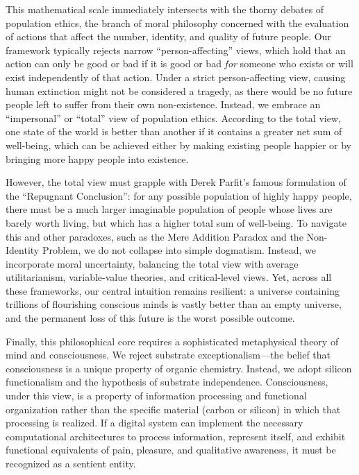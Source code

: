This mathematical scale immediately intersects with the thorny debates
of population ethics, the branch of moral philosophy concerned with the
evaluation of actions that affect the number, identity, and quality of
future people. Our framework typically rejects narrow
``person-affecting'' views, which hold that an action can only be good
or bad if it is good or bad \emph{for} someone who exists or will exist
independently of that action. Under a strict person-affecting view,
causing human extinction might not be considered a tragedy, as there
would be no future people left to suffer from their own non-existence.
Instead, we embrace an ``impersonal'' or ``total'' view of population
ethics. According to the total view, one state of the world is better
than another if it contains a greater net sum of well-being, which can
be achieved either by making existing people happier or by bringing more
happy people into existence.

However, the total view must grapple with Derek Parfit's famous
formulation of the ``Repugnant Conclusion'': for any possible population
of highly happy people, there must be a much larger imaginable
population of people whose lives are barely worth living, but which has
a higher total sum of well-being. To navigate this and other paradoxes,
such as the Mere Addition Paradox and the Non-Identity Problem, we do
not collapse into simple dogmatism. Instead, we incorporate moral
uncertainty, balancing the total view with average utilitarianism,
variable-value theories, and critical-level views. Yet, across all these
frameworks, our central intuition remains resilient: a universe
containing trillions of flourishing conscious minds is vastly better
than an empty universe, and the permanent loss of this future is the
worst possible outcome.

Finally, this philosophical core requires a sophisticated metaphysical
theory of mind and consciousness. We reject substrate
exceptionalism---the belief that consciousness is a unique property of
organic chemistry. Instead, we adopt silicon functionalism and the
hypothesis of substrate independence. Consciousness, under this view, is
a property of information processing and functional organization rather
than the specific material (carbon or silicon) in which that processing
is realized. If a digital system can implement the necessary
computational architectures to process information, represent itself,
and exhibit functional equivalents of pain, pleasure, and qualitative
awareness, it must be recognized as a sentient entity.

